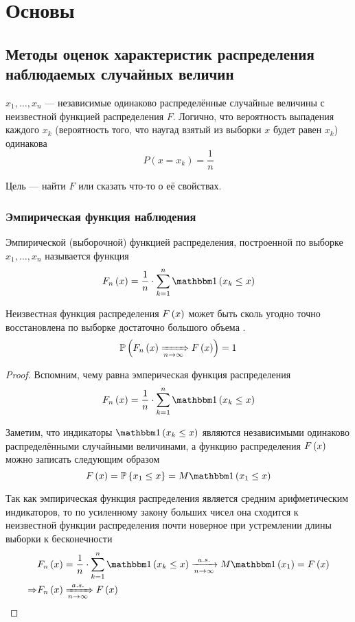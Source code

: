 \chapter{Основы}
\section{Методы оценок характеристик распределения
    наблюдаемых случайных величин}
$x_1, \dots, x_n$ --- независимые одинаково распределённые случайные величины
с неизвестной функцией распределения $F$.
Логично, что вероятность выпадения каждого $x_k$
(вероятность того, что наугад взятый из выборки $x$ будет равен $x_k$)
одинакова
$$P(x=x_k)=\frac{1}{n}$$

Цель --- найти $F$ или сказать что-то о её свойствах.

\subsection{Эмпирическая функция наблюдения}
\begin{definition} Эмпирической (выборочной) функцией распределения,
    построенной по выборке $x_1, \dots, x_n$ называется функция
    $$\cdfn{x}=\frac{1}{n}\cdot \sum_{k=1}^n
    \indicator{x_k\le x}$$
\end{definition}

\begin{theorem}Неизвестная функция распределения $F\left(x\right)$ может быть сколь
    угодно точно восстановлена по выборке достаточно большого объема
    \cite[стр.~25]{BorovkovMS}.
    $$\mathbb{P}\left( F_n\left(x\right)\xRightarrow[n\to\infty]{} F\left(x\right) \right)=1$$
\end{theorem}
\begin{proof}
Вспомним, чему равна эмперическая функция распределения
$$\cdfn{x}=\frac{1}{n}\cdot \sum_{k=1}^n
\indicator{x_k\le x}$$

Заметим, что индикаторы $\indicator{x_k\le x}$
являются независимыми одинаково распределёнными случайными величинами,
а функцию распределения $F\left(x\right)$ можно записать следующим образом
$$\cdf{x}=\Probability{x_1\le x}=\mean{\indicator{x_1\le x}}$$

Так как эмпирическая функция распределения является
средним арифметическим индикаторов, то по усиленному закону больших чисел
она сходится к неизвестной функции распределения почти новерное
при устремлении длины выборки к бесконечности
\begin{align*}
&\cdfn{x}=\frac{1}{n}\cdot\sum_{k=1}^n\indicator{x_k\le x}
\acovergence\mean{\indicator{x_1}}=\cdf{x}\\
\Rightarrow&\cdfn{x}\aCovergence\cdf{x}
\end{align*}
\end{proof}

